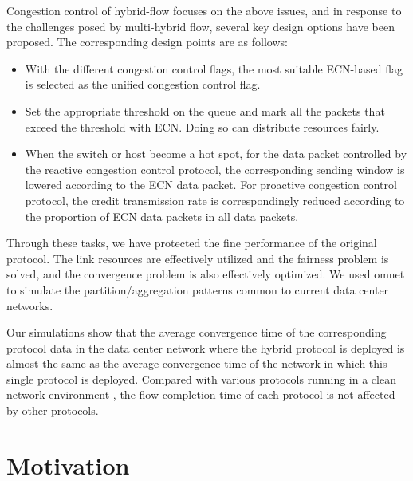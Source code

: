 \documentclass[conference]{IEEEtran}
\begin{document}
\indent Congestion control of hybrid-flow focuses on the above issues, and in response to the challenges posed by multi-hybrid flow, several key design options have been proposed. The corresponding design points are as follows:

\begin{itemize}

\item With the different congestion control flags, the most suitable ECN-based flag is selected as the unified congestion control flag.

\item Set the appropriate threshold on the queue and mark all the packets that exceed the threshold with ECN. Doing so can distribute resources fairly.

\item When the switch or host become a hot spot, for the data packet controlled by the reactive congestion control protocol, the corresponding sending window is lowered according to the ECN data packet. For proactive congestion control protocol, the credit transmission rate is correspondingly reduced according to the proportion of ECN data packets in all data packets.

\end{itemize}

\indent Through these tasks, we have protected the fine performance of the original protocol. The link resources are effectively utilized and the fairness problem is solved, and the convergence problem is also effectively optimized. We used omnet to simulate the partition/aggregation patterns common to current data center networks.

\indent Our simulations show that the average convergence time of the corresponding protocol data in the data center network where the hybrid protocol is deployed is almost the same as the average convergence time of the network in which this single protocol is deployed. Compared with various protocols running in a clean network environment , the flow completion time of each protocol is not affected by other protocols.

\section{Motivation}
\end{document}
